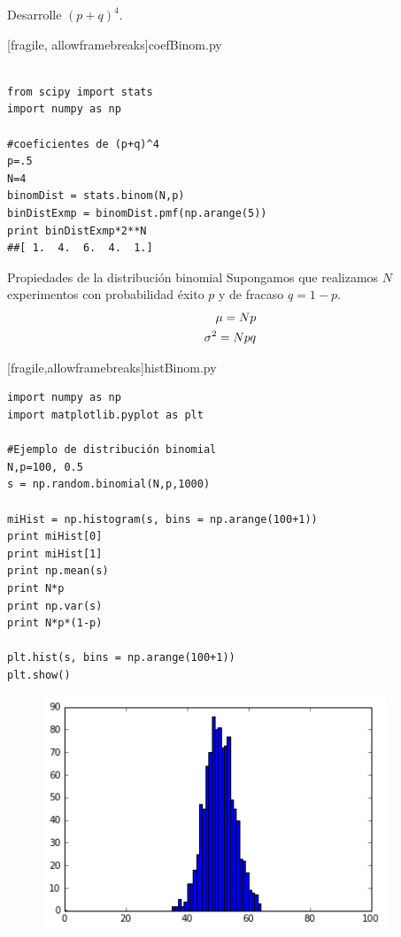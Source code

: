  \begin{ejemplo}
  \label{exmp:7.3}
  Desarrolle $\left( p+q \right)^{4}.$
 \end{ejemplo}


[fragile, allowframebreaks]{coefBinom.py}
\begin{verbatim}

from scipy import stats
import numpy as np

#coeficientes de (p+q)^4
p=.5
N=4
binomDist = stats.binom(N,p)
binDistExmp = binomDist.pmf(np.arange(5))
print binDistExmp*2**N
##[ 1.  4.  6.  4.  1.]
\end{verbatim}


{Propiedades de la distribución binomial} Supongamos que realizamos $N$ experimentos con probabilidad éxito $p$ y de fracaso $q=1-p.$
\begin{align}
 \label{binom:mean}
 \mu = Np \\
 \label{binom:var}
 \sigma^{2}=Npq
\end{align}


[fragile,allowframebreaks]{histBinom.py}
 \begin{verbatim}
import numpy as np
import matplotlib.pyplot as plt

#Ejemplo de distribución binomial
N,p=100, 0.5
s = np.random.binomial(N,p,1000)

miHist = np.histogram(s, bins = np.arange(100+1))
print miHist[0]
print miHist[1]
print np.mean(s)
print N*p
print np.var(s)
print N*p*(1-p)

plt.hist(s, bins = np.arange(100+1))
plt.show()
 \end{verbatim}




 \begin{figure}
 \centering
 \includegraphics[height=7cm,keepaspectratio=true]{./pe/distBin01.png}
 \label{distBin01}
\end{figure}



